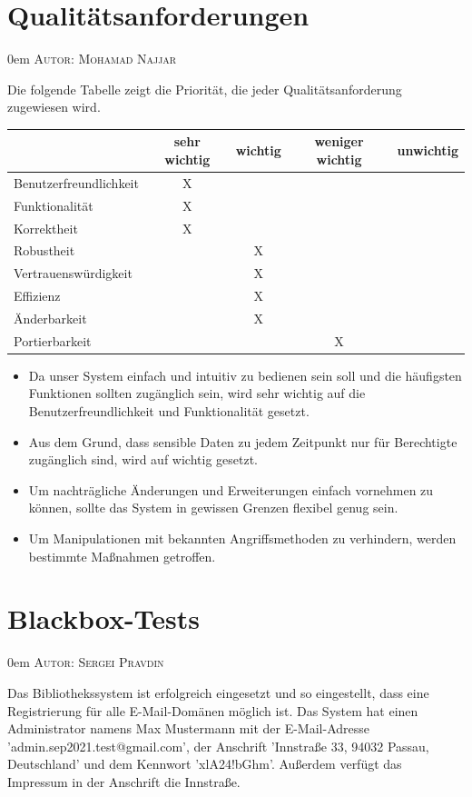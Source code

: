 \documentclass{article}
\makeatletter
\newcommand{\sectionauthor}[1]{
	{\parindent 0em \large \scshape Autor: #1 \par \nobreak \vspace*{2em}}
	\@afterheading
}
\makeatother
\begin{document}
\restoregeometry
\newpage

\section{Qualitätsanforderungen} %
\sectionauthor{Mohamad Najjar}

	Die folgende Tabelle zeigt die Priorität, die jeder Qualitätsanforderung zugewiesen wird.

\begin{center}
\begin{tabular}{ |l||c|c|c|c| }
 \hline
  & sehr wichtig & wichtig & weniger wichtig & unwichtig \\
 \hline\hline
 Benutzerfreundlichkeit & X & & & \\
 \hline
 Funktionalität & X & & & \\
 \hline
 Korrektheit & X & & & \\
 \hline
 Robustheit & & X & & \\
 \hline
 Vertrauenswürdigkeit & & X & & \\
 \hline
 Effizienz & & X & & \\
 \hline
 Änderbarkeit & & X & & \\
 \hline
 Portierbarkeit & &   & X & \\

 \hline
\end{tabular}
\end{center}
\begin{itemize}
\item Da  unser System einfach und intuitiv zu bedienen sein soll und die häufigsten Funktionen sollten
 zugänglich sein, wird sehr wichtig  auf die Benutzerfreundlichkeit und Funktionalität gesetzt.
\item Aus dem Grund, dass sensible Daten zu jedem Zeitpunkt nur für Berechtigte zugänglich sind, wird auf  wichtig gesetzt.
\item Um nachträgliche Änderungen und Erweiterungen einfach vornehmen zu können,
sollte das System in gewissen Grenzen flexibel genug sein.
\item Um Manipulationen mit bekannten Angriffsmethoden zu verhindern, werden bestimmte Maßnahmen getroffen.
\end{itemize}
\section{Blackbox-Tests} %
\sectionauthor{Sergei Pravdin}
Das Bibliothekssystem ist erfolgreich eingesetzt und so eingestellt, dass eine Registrierung für alle E-Mail-Domänen möglich ist. Das System hat einen Administrator namens Max Mustermann mit der E-Mail-Adresse 'admin.sep2021.test@gmail.com', der Anschrift 'Innstraße 33, 94032 Passau, Deutschland' und dem Kennwort 'xlA24!bGhm'. Außerdem verfügt das Impressum in der Anschrift die Innstraße. \vspace{0.5em}
\end{document}
